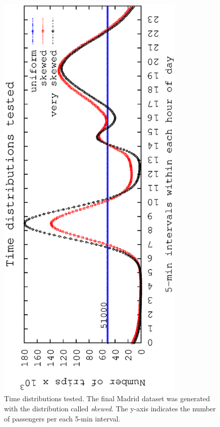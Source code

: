 \begin{itemize}
	 \begin{figure}[ht]
		\begin{center}
			\includegraphics[angle=-90,width=0.80\textwidth]{figures_synt/timedistrib.eps}		
			\caption{Time distributions tested. The final Madrid dataset was generated with the distribution called \textit{skewed}. The y-axis indicates the number of passengers per each 5-min interval.}
			\label{fig:ctr:distrib}
		\end{center}
	\end{figure}


\end{itemize}
